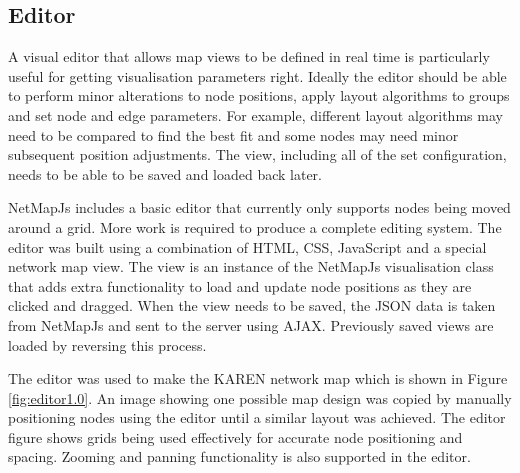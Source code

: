 \documentclass[11pt, a4paper]{article}
\begin{document}
\subsection{Editor}
\label{sec:editor.impl}

A visual editor that allows map views to be defined in real time is particularly
useful for getting visualisation parameters right. Ideally the editor should be
able to perform minor alterations to node positions, apply layout algorithms to
groups and set node and edge parameters. For example, different layout
algorithms may need to be compared to find the best fit and some nodes may need
minor subsequent position adjustments. The view, including all of the set
configuration, needs to be able to be saved and loaded back later.

NetMapJs includes a basic editor that currently only supports nodes being moved
around a grid. More work is required to produce a complete editing system. The
editor was built using a combination of HTML, CSS, JavaScript and a special
network map view. The view is an instance of the NetMapJs visualisation class
that adds extra functionality to load and update node positions as they are
clicked and dragged. When the view needs to be saved, the JSON data is taken
from NetMapJs and sent to the server using AJAX. Previously saved views are
loaded by reversing this process.

The editor was used to make the KAREN network map which is shown in Figure
\ref{fig:editor1.0}. An image showing one possible map design was copied by
manually positioning nodes using the editor until a similar layout was achieved.
The editor figure shows grids being used effectively for accurate node
positioning and spacing. Zooming and panning functionality is also supported in
the editor.
\end{document}
